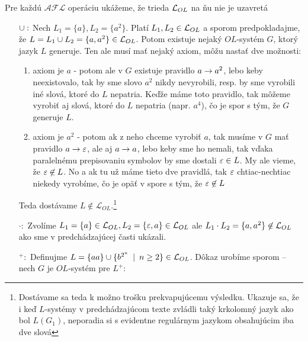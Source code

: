 \begin{dokaz}
    Pre každú $\mathcal{AFL}$ operáciu ukážeme, že trieda
    $\mathcal{L}_{OL}$ na ňu nie je uzavretá

    \begin{itemize}
    \item[$\cup:$] Nech $L_1 = \{ a \}, L_2=\{ a^2 \}$.
        Platí $L_1,L_2 \in \mathcal{L}_{OL}$ a sporom
        predpokladajme, že $L=L_1 \cup L_2 = \{ a, a^2 \}\in \mathcal{L}_{OL}$.
        Potom existuje nejaký $OL$-systém $G$, ktorý jazyk $L$
        generuje. Ten ale musí mať nejaký axiom, môžu nastať dve možnosti:
        \begin{enumerate}
        \item axiom je $a$ - potom ale v $G$ existuje pravidlo 
            $a\rightarrow a^2$,
            lebo keby neexistovalo, tak by sme slovo $a^2$ nikdy
            nevyrobili, resp. by sme vyrobili iné slová, ktoré do $L$
            nepatria. Keďže máme toto pravidlo, tak môžeme vyrobiť aj slová,
            ktoré do $L$ nepatria (napr. $a^4$), čo je spor s tým, že
            $G$ generuje $L$.

        \item axiom je $a^{2}$ - potom ak z neho chceme vyrobiť $a$, tak
            musíme v $G$ mať pravidlo $a\rightarrow\varepsilon$,
            ale aj $a\rightarrow a$, lebo
            keby sme ho nemali, tak vďaka paralelnému prepisovaniu symbolov by
            sme dostali $\varepsilon \in L$. My ale vieme, že
            $\varepsilon\not\in L$. No a ak tu už máme tieto dve pravidlá, tak
            $\varepsilon$ chtiac-nechtiac niekedy vyrobíme, čo je opäť v spore
            s tým, že $\varepsilon\not\in L$
        \end{enumerate}

        Teda dostávame $L\not\in\mathcal{L}_{OL}$.\footnote{Dostávame sa
        teda k možno trošku prekvapujúcemu výsledku. Ukazuje sa, že i keď
        $L$-systémy v predchádzajúcom texte zvládli taký krkolomný jazyk
        ako bol $L(G_{1})$, neporadia si s evidentne regulárnym jazykom
        obsahujúcim iba dve slová}

    \item[$\cdot:$] Zvolíme $L_1=\{a\}\in \mathcal{L}_{OL},
        L_2=\{\varepsilon,a\}\in\mathcal{L}_{OL}$ ale $L_1 \cdot
        L_2=\{a,a^2\}\not\in \mathcal{L}_{OL}$ ako sme v
        predchádzajúcej časti ukázali.

    \item[$ ^+:$] Definujme 
        $L=\{aa\} \cup \{ b^{2^n} \enspace |\enspace n \ge 2 \}
            \in\mathcal{L}_{OL}$. Dôkaz urobíme sporom -- nech $G$ je
        $OL$-systém pre $L^{+}$:


\end{itemize}
\end{dokaz}
